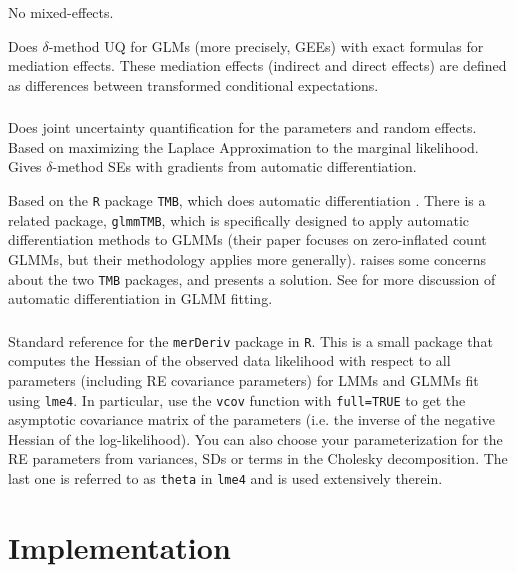 \documentclass{report}
\begin{document}
No mixed-effects.

Does $\delta$-method UQ for GLMs (more precisely, GEEs) with exact formulas for mediation effects. These mediation effects (indirect and direct effects) are defined as differences between transformed conditional expectations. 


\subsection{\citet{Zhe21}}

Does joint uncertainty quantification for the parameters and random effects. Based on maximizing the Laplace Approximation to the marginal likelihood. Gives $\delta$-method SEs with gradients from automatic differentiation.

Based on the \texttt{R} package \texttt{TMB}, which does automatic differentiation \citep{Kri16}. There is a related package, \texttt{glmmTMB}, which is specifically designed to apply automatic differentiation methods to GLMMs \citep{Bro17} (their paper focuses on zero-inflated count GLMMs, but their methodology applies more generally). \citet{Zhe21} raises some concerns about the two \texttt{TMB} packages, and presents a solution. See \citet{Ska06} for more discussion of automatic differentiation in GLMM fitting.

\subsection{\citet{Wan18}}

Standard reference for the \texttt{merDeriv} package in \texttt{R}. This is a small package that computes the Hessian of the observed data likelihood with respect to all parameters (including RE covariance parameters) for LMMs and GLMMs fit using \texttt{lme4}. In particular, use the \texttt{vcov} function with \texttt{full=TRUE} to get the asymptotic covariance matrix of the parameters (i.e. the inverse of the negative Hessian of the log-likelihood). You can also choose your parameterization for the RE parameters from variances, SDs or terms in the Cholesky decomposition. The last one is referred to as \texttt{theta} in \texttt{lme4} and is used extensively therein.






\chapter{Implementation}
\end{document}
